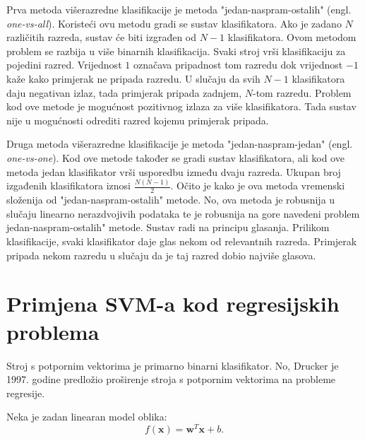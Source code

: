 \documentclass[times, utf8, zavrsni, numeric]{fer}
\begin{document}
\par Prva metoda višerazredne klasifikacije je metoda "jedan-naspram-ostalih" (engl. \textit{one-vs-all}).
Koristeći ovu metodu gradi se sustav klasifikatora.
Ako je zadano $N$ različitih razreda, sustav će biti izgrađen od $N-1$ klasifikatora.
Ovom metodom problem se razbija u više binarnih klasifikacija.
Svaki stroj vrši klasifikaciju za pojedini razred. Vrijednost $1$ označava pripadnost tom razredu dok
vrijednost $-1$ kaže kako primjerak ne pripada razredu.
U slučaju da svih $N-1$ klasifikatora daju negativan izlaz, tada primjerak pripada zadnjem,
$N$-tom razredu. Problem kod ove metode je mogućnost pozitivnog izlaza za više klasifikatora.
Tada sustav nije u mogućnosti odrediti razred kojemu primjerak pripada.

\par Druga metoda višerazredne klasifikacije je metoda "jedan-naspram-jedan" (engl. \textit{one-vs-one}).
Kod ove metode također se gradi sustav klasifikatora, ali kod ove metoda jedan klasifikator vrši usporedbu
između dvaju razreda.
Ukupan broj izgađenih klasifikatora iznosi $\frac{N(N - 1)}{2}$.
Očito je kako je ova metoda vremenski složenija od "jedan-naspram-ostalih" metode. 
No, ova metoda je robusnija u slučaju linearno nerazdvojivih podataka te je robusnija na gore navedeni 
problem jedan-naspram-ostalih" metode.
Sustav radi na principu glasanja. 
Prilikom klasifikacije, svaki klasifikator daje glas nekom od relevantnih razreda. 
Primjerak pripada nekom razredu u slučaju da je taj razred dobio najviše glasova.

\section{Primjena SVM-a kod regresijskih problema}
Stroj s potpornim vektorima je primarno binarni klasifikator. 
No, Drucker je 1997. godine predložio proširenje stroja s potpornim vektorima na 
probleme regresije\cite{Drucker97supportvector}.

\par Neka je zadan linearan model oblika:
\begin{equation}
  f(\mathbf{x}) = \mathbf{w}^T\mathbf{x} + b. 
\end{equation}
\end{document}

